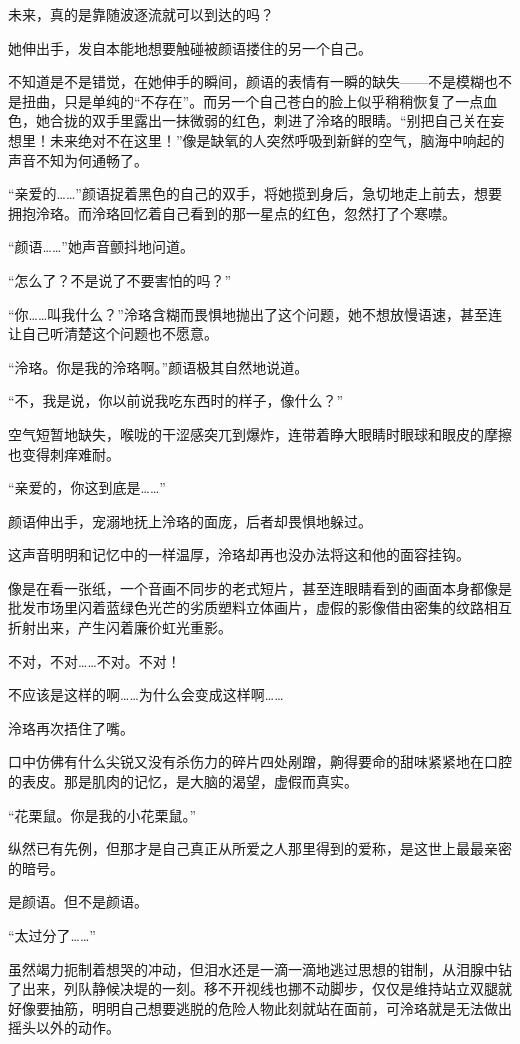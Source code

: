 \documentclass[UTF8, scheme = chinese, openany]{ctexbook}
\begin{document}
未来，真的是靠随波逐流就可以到达的吗？

她伸出手，发自本能地想要触碰被颜语搂住的另一个自己。

不知道是不是错觉，在她伸手的瞬间，颜语的表情有一瞬的缺失——不是模糊也不是扭曲，只是单纯的“不存在”。而另一个自己苍白的脸上似乎稍稍恢复了一点血色，她合拢的双手里露出一抹微弱的红色，刺进了泠珞的眼睛。“别把自己关在妄想里！未来绝对不在这里！”像是缺氧的人突然呼吸到新鲜的空气，脑海中响起的声音不知为何通畅了。

“亲爱的……”颜语捉着黑色的自己的双手，将她揽到身后，急切地走上前去，想要拥抱泠珞。而泠珞回忆着自己看到的那一星点的红色，忽然打了个寒噤。

“颜语……”她声音颤抖地问道。

“怎么了？不是说了不要害怕的吗？”

“你……叫我什么？”泠珞含糊而畏惧地抛出了这个问题，她不想放慢语速，甚至连让自己听清楚这个问题也不愿意。

“泠珞。你是我的泠珞啊。”颜语极其自然地说道。

“不，我是说，你以前说我吃东西时的样子，像什么？”

空气短暂地缺失，喉咙的干涩感突兀到爆炸，连带着睁大眼睛时眼球和眼皮的摩擦也变得刺痒难耐。

“亲爱的，你这到底是……”

颜语伸出手，宠溺地抚上泠珞的面庞，后者却畏惧地躲过。

这声音明明和记忆中的一样温厚，泠珞却再也没办法将这和他的面容挂钩。

像是在看一张纸，一个音画不同步的老式短片，甚至连眼睛看到的画面本身都像是批发市场里闪着蓝绿色光芒的劣质塑料立体画片，虚假的影像借由密集的纹路相互折射出来，产生闪着廉价虹光重影。

不对，不对……不对。不对！

不应该是这样的啊……为什么会变成这样啊……

泠珞再次捂住了嘴。

口中仿佛有什么尖锐又没有杀伤力的碎片四处剐蹭，齁得要命的甜味紧紧地在口腔的表皮。那是肌肉的记忆，是大脑的渴望，虚假而真实。

“花栗鼠。你是我的小花栗鼠。”

纵然已有先例，但那才是自己真正从所爱之人那里得到的爱称，是这世上最最亲密的暗号。

是颜语。但不是颜语。

“太过分了……”

虽然竭力扼制着想哭的冲动，但泪水还是一滴一滴地逃过思想的钳制，从泪腺中钻了出来，列队静候决堤的一刻。移不开视线也挪不动脚步，仅仅是维持站立双腿就好像要抽筋，明明自己想要逃脱的危险人物此刻就站在面前，可泠珞就是无法做出摇头以外的动作。
\end{document}
